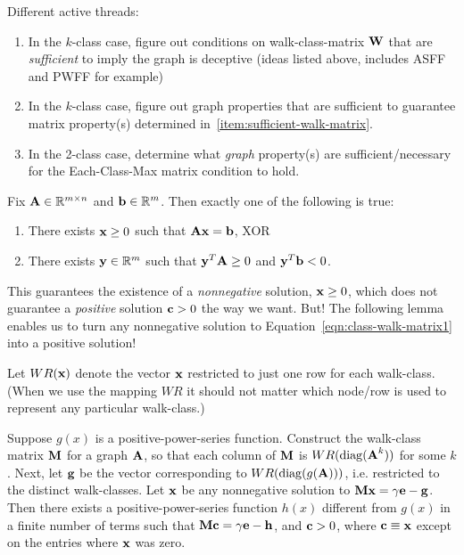 
Different active threads:
\begin{enumerate}
  \item\label{item:sufficient-walk-matrix} In the $k$-class case, figure out conditions on walk-class-matrix $\textbf{W}$ that are \emph{sufficient} to imply the graph is deceptive (ideas listed above, includes ASFF and PWFF for example)
  \item In the $k$-class case, figure out graph properties that are sufficient to guarantee matrix property(s) determined in~\ref{item:sufficient-walk-matrix}.
  \item In the 2-class case, determine what \emph{graph} property(s) are sufficient/necessary for the Each-Class-Max matrix condition to hold.
\end{enumerate}




\begin{theorem}[Farkas]
  Fix $\textbf{A} \in \mathbb{R}^{m \times n}$ and $\textbf{b} \in \mathbb{R}^m$. Then exactly one of the following is true:
  \begin{enumerate}
    \item There exists $\textbf{x} \geq 0$ such that $\textbf{A}\textbf{x} = \textbf{b}$, XOR
    \item There exists $\textbf{y} \in \mathbb{R}^m$ such that $\textbf{y}^T\textbf{A} \geq 0$ and $\textbf{y}^T \textbf{b} < 0$.
  \end{enumerate}
\end{theorem}

This guarantees the existence of a \emph{nonnegative} solution, $\textbf{x} \geq 0$, which does not guarantee a \emph{positive} solution $\textbf{c} > 0$ the way we want.
But! The following lemma enables us to turn any nonnegative solution to Equation~\eqref{eqn:class-walk-matrix1} into a positive solution!

Let $WR(\textbf{x})$ denote the vector $\textbf{x}$ restricted to just one row for each walk-class. (When we use the mapping $WR$ it should not matter which node/row is used to represent any particular walk-class.)

\begin{lemma}\label{thm:farkaslemmalemma}
  Suppose $g(x)$ is a positive-power-series function. Construct the walk-class matrix $\textbf{M}$ for a graph $\textbf{A}$, so that each column of $\textbf{M}$ is $WR( \operatorname{diag}(\textbf{A}^k))$ for some $k$.
  Next, let $\textbf{g}$ be the vector corresponding to $WR(\operatorname{diag}(g(\textbf{A})))$, i.e. restricted to the distinct walk-classes.
  Let $\textbf{x}$ be any nonnegative solution to $\textbf{M} \textbf{x} = \gamma\textbf{e} - \textbf{g}$.
  Then there exists a positive-power-series function $h(x)$ different from $g(x)$ in a finite number of terms such that
  $\textbf{M}\textbf{c} = \gamma\textbf{e} - \textbf{h}$, and $\textbf{c} > 0 $, where $\textbf{c} \equiv \textbf{x}$ except on the entries where $\textbf{x}$ was zero.
\end{lemma}


